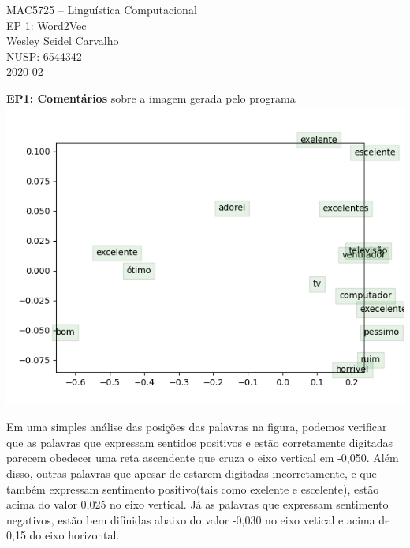 \documentclass[a4paper,12pt]{article}
\begin{document}
\begin{center}
MAC5725 – Linguística Computacional\\
EP 1: Word2Vec\\
Wesley Seidel Carvalho\\
NUSP: 6544342\\
2020-02\\ %
\end{center}

{\Large \textbf{EP1: Comentários} sobre a imagem gerada pelo programa}\\


\includegraphics{vetores_de_palavras}

Em uma simples análise das posições das palavras na figura, podemos verificar que as palavras que expressam sentidos positivos e estão corretamente digitadas parecem obedecer uma reta ascendente que cruza o eixo vertical em -0,050. Além disso, outras palavras que apesar de estarem digitadas incorretamente, e que também expressam sentimento positivo(tais como exelente e escelente), estão acima do valor 0,025 no eixo vertical. Já as palavras que expressam sentimento negativos, estão bem difinidas abaixo do valor -0,030 no eixo vetical e acima de 0,15 do eixo horizontal. 
\end{document}
